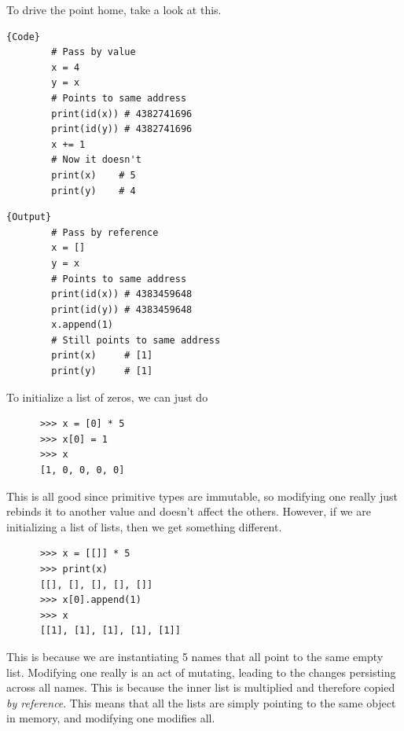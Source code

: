   \begin{example}
    \label{ex:rebinding-against-mutation}
    To drive the point home, take a look at this.

    \noindent\begin{minipage}{.5\textwidth}
      \begin{lstlisting}[]{Code}
        # Pass by value
        x = 4 
        y = x
        # Points to same address
        print(id(x)) # 4382741696 
        print(id(y)) # 4382741696 
        x += 1 
        # Now it doesn't
        print(x)    # 5
        print(y)    # 4
      \end{lstlisting}
      \end{minipage}
      \hfill
      \begin{minipage}{.49\textwidth}
      \begin{lstlisting}[]{Output}
        # Pass by reference
        x = [] 
        y = x
        # Points to same address 
        print(id(x)) # 4383459648
        print(id(y)) # 4383459648
        x.append(1) 
        # Still points to same address
        print(x)     # [1]
        print(y)     # [1]
      \end{lstlisting}
    \end{minipage}
  \end{example}

  \begin{example}
    \label{ex:common-traps}
    To initialize a list of zeros, we can just do 
    \begin{lstlisting}
      >>> x = [0] * 5
      >>> x[0] = 1
      >>> x
      [1, 0, 0, 0, 0] 
    \end{lstlisting}
    This is all good since primitive types are immutable, so modifying one really just rebinds it to another value and doesn't affect the others. However, if we are initializing a list of lists, then we get something different. 
    \begin{lstlisting}
      >>> x = [[]] * 5
      >>> print(x)
      [[], [], [], [], []]
      >>> x[0].append(1)
      >>> x
      [[1], [1], [1], [1], [1]] 
    \end{lstlisting}
    This is because we are instantiating 5 names that all point to the same empty list. Modifying one really is an act of mutating, leading to the changes persisting across all names. This is because the inner list is multiplied and therefore copied \textit{by reference}. This means that all the lists are simply pointing to the same object in memory, and modifying one modifies all.  
  \end{example}

